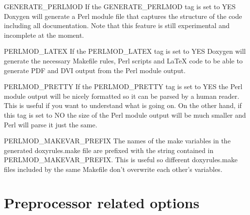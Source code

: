 \begin{DoxyDescription}
\item[{\ttfamily GENERATE\_\-PERLMOD} ] If the {\ttfamily GENERATE\_\-PERLMOD} tag is set to {\ttfamily YES} Doxygen will generate a Perl module file that captures the structure of the code including all documentation. Note that this feature is still experimental and incomplete at the moment.

\label{config_cfg_perlmod_latex}
\hypertarget{config_cfg_perlmod_latex}{}
 
\item[{\ttfamily PERLMOD\_\-LATEX} ] If the {\ttfamily PERLMOD\_\-LATEX} tag is set to {\ttfamily YES} Doxygen will generate the necessary Makefile rules, Perl scripts and LaTeX code to be able to generate PDF and DVI output from the Perl module output.

\label{config_cfg_perlmod_pretty}
\hypertarget{config_cfg_perlmod_pretty}{}
 
\item[{\ttfamily PERLMOD\_\-PRETTY} ] If the {\ttfamily PERLMOD\_\-PRETTY} tag is set to {\ttfamily YES} the Perl module output will be nicely formatted so it can be parsed by a human reader. This is useful if you want to understand what is going on. On the other hand, if this tag is set to {\ttfamily NO} the size of the Perl module output will be much smaller and Perl will parse it just the same.

\label{config_cfg_perlmod_makevar_prefix}
\hypertarget{config_cfg_perlmod_makevar_prefix}{}
 
\item[{\ttfamily PERLMOD\_\-MAKEVAR\_\-PREFIX} ] The names of the make variables in the generated doxyrules.make file are prefixed with the string contained in {\ttfamily PERLMOD\_\-MAKEVAR\_\-PREFIX}. This is useful so different doxyrules.make files included by the same Makefile don't overwrite each other's variables.


\end{DoxyDescription}\hypertarget{config_config_prepro}{}\section{Preprocessor related options}\label{config_config_prepro}
\label{config_cfg_enable_preprocessing}
\hypertarget{config_cfg_enable_preprocessing}{}
 
